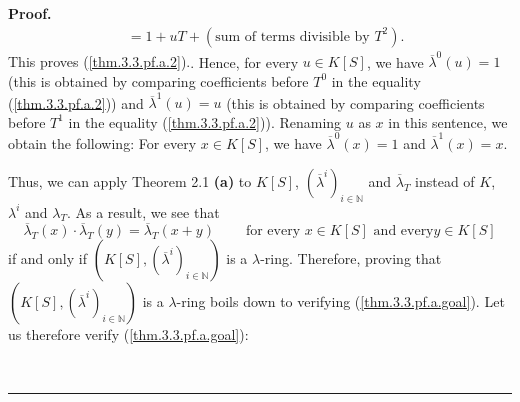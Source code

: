 \documentclass[numbers=enddot,12pt,final,onecolumn,notitlepage]{scrartcl}%
\newenvironment{proof}[1][Proof]{\noindent\textbf{#1.} }{\ \rule{0.5em}{0.5em}}
\begin{document}
\begin{proof}
{\begin{align*}
&  =1+uT+\left(  \text{sum of terms divisible by }T^{2}\right)  .
\end{align*}
This proves (\ref{thm.3.3.pf.a.2}).}. Hence, for every $u\in K\left[
S\right]  $, we have $\overline{\lambda}^{0}\left(  u\right)  =1$ (this is
obtained by comparing coefficients before $T^{0}$ in the equality
(\ref{thm.3.3.pf.a.2})) and $\overline{\lambda}^{1}\left(  u\right)  =u$ (this
is obtained by comparing coefficients before $T^{1}$ in the equality
(\ref{thm.3.3.pf.a.2})). Renaming $u$ as $x$ in this sentence, we obtain the
following: For every $x\in K\left[  S\right]  $, we have $\overline{\lambda
}^{0}\left(  x\right)  =1$ and $\overline{\lambda}^{1}\left(  x\right)  =x$.

Thus, we can apply Theorem 2.1 \textbf{(a)} to $K\left[  S\right]  $, $\left(
\overline{\lambda}^{i}\right)  _{i\in\mathbb{N}}$ and $\overline{\lambda}_{T}$
instead of $K$, $\lambda^{i}$ and $\lambda_{T}$. As a result, we see that
\begin{equation}
\overline{\lambda}_{T}\left(  x\right)  \cdot\overline{\lambda}_{T}\left(
y\right)  =\overline{\lambda}_{T}\left(  x+y\right)
\ \ \ \ \ \ \ \ \ \ \text{for every }x\in K\left[  S\right]  \text{ and every
}y\in K\left[  S\right]  \label{thm.3.3.pf.a.goal}%
\end{equation}
if and only if $\left(  K\left[  S\right]  ,\left(  \overline{\lambda}%
^{i}\right)  _{i\in\mathbb{N}}\right)  $ is a $\lambda$-ring. Therefore,
proving that $\left(  K\left[  S\right]  ,\left(  \overline{\lambda}%
^{i}\right)  _{i\in\mathbb{N}}\right)  $ is a $\lambda$-ring boils down to
verifying (\ref{thm.3.3.pf.a.goal}). Let us therefore verify
(\ref{thm.3.3.pf.a.goal}):


\end{proof}
\end{document}
